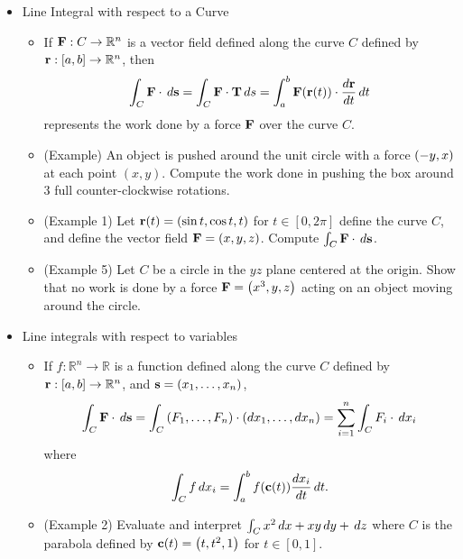 \documentclass[11pt]{article}
\begin{document}
\begin{itemize}
  \item Line Integral with respect to a Curve
    \begin{itemize}
      \item If \(\mathbf{F}:C\to\mathbb R^n\) is a vector field defined
            along the curve \(C\) defined by \(\mathbf{r}:[a,b]\to\mathbb R^n\),
            then
            \[
              \int_C \mathbf{F}\cdot\,d\mathbf{s}
                =
              \int_C \mathbf{F}\cdot\mathbf{T}\,d s
                =
              \int_a^b \mathbf{F}(\mathbf{r}(t))\cdot \frac{d\mathbf{r}}{dt}\,d t
            \]
            represents the work done by a force \(\mathbf{F}\) over the curve
            \(C\).
      \item (Example) An object is pushed around the unit circle with
            a force \(\left(-y,x\right)\) at each point \((x,y)\). Compute the
            work done in pushing the box around \(3\) full counter-clockwise
            rotations.
      \item (Example 1) Let \(\mathbf{r}(t)=\left(\sin t,\cos t,t\right)\)
            for \(t\in[0,2\pi]\)
            define the curve \(C\), and define the vector field
            \(\mathbf{F}=\left(x,y,z\right)\). Compute
            \(\int_C\mathbf{F}\cdot\,d\mathbf{s}\).
      \item (Example 5) Let \(C\) be a circle in the \(yz\) plane centered
            at the origin.
            Show that no work is done by a force \(\mathbf{F}=\left(x^3,y,z\right)\)
            acting on an object moving around the circle.
    \end{itemize}
  \item Line integrals with respect to variables
    \begin{itemize}
      \item If \(f:\mathbb R^n\to\mathbb R\) is a function defined
            along the curve \(C\) defined by \(\mathbf{r}:[a,b]\to\mathbb R^n\),
            and \(\mathbf{s}=\left(x_1,\dots,x_n\right)\),
            \[
              \int_C \mathbf{F}\cdot\,d\mathbf{s}
                =
              \int_C \left(F_1,\dots,F_n\right)\cdot\left(dx_1,\dots,dx_n\right)
                =
              \sum_{i=1}^n \int_C F_i\cdot\,d x_i
            \]
            where
            \[
              \int_C f\,d x_i
                =
              \int_a^b f(\mathbf{c}(t))\frac{dx_i}{dt}\,d t
            .\]
      \item (Example 2) Evaluate and interpret
            \(\int_C x^2\,d x+xy\,d y+\,d z\) where \(C\) is the
            parabola defined
            by \(\mathbf{c}(t)=\left(t,t^2,1\right)\) for \(t\in[0,1]\).

\end{itemize}
\end{itemize}
\end{document}

